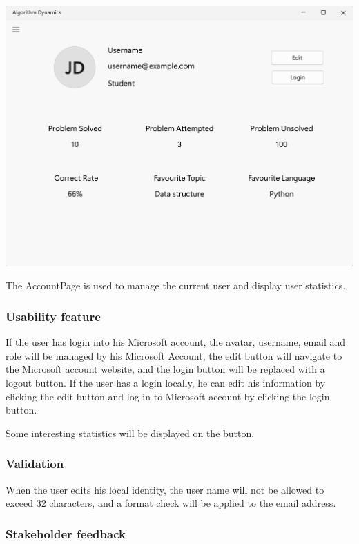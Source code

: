 \documentclass[a4paper]{report}
\begin{document}
\includegraphics[width=\textwidth, height=\textheight, keepaspectratio]{AccountPage-design}

The AccountPage is used to manage the current user and display user statistics.

\subsubsection{Usability feature}

If the user has login into his Microsoft account, the avatar, username, email and role will be managed by his Microsoft Account, the edit button will navigate to the Microsoft account website, and the login button will be replaced with a logout button. If the user has a login locally, he can edit his information by clicking the edit button and log in to Microsoft account by clicking the login button.

Some interesting statistics will be displayed on the button.

\subsubsection{Validation}

When the user edits his local identity, the user name will not be allowed to exceed 32 characters, and a format check will be applied to the email address.

\subsubsection{Stakeholder feedback}
\label{subsubsec:accountpage stakeholder feedback}
\end{document}
